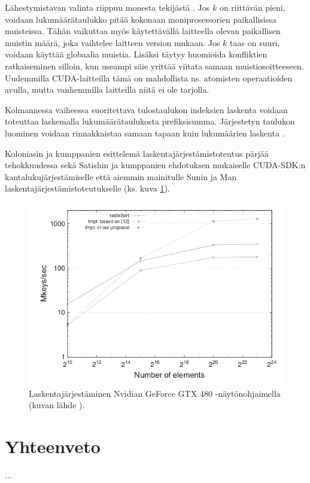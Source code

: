 \documentclass[a4paper,11pt]{article}
\begin{document}
Lähestymistavan valinta riippuu monesta tekijästä \cite{kolonias2011}. Jos $k$ on riittävän pieni, voidaan lukumäärätaulukko pitää kokonaan moniprosessorien paikallisissa muisteissa. Tähän vaikuttaa myös käytettävällä laitteella olevan paikallisen muistin määrä, joka vaihtelee laitteen version mukaan. Jos $k$ taas on suuri, voidaan käyttää globaalia muistia. Lisäksi täytyy huomioida konfliktien ratkaiseminen silloin, kun useampi säie yrittää viitata samaan muistiosoitteeseen. Uudemmilla CUDA-laitteilla tämä on mahdollista ns. atomisten operaatioiden avulla, mutta vanhemmilla laitteilla niitä ei ole tarjolla.

Kolmannessa vaiheessa suoritettava tulostaulukon indeksien laskenta voidaan toteuttaa laskemalla lukumäärätaulukosta prefiksisumma. Järjestetyn taulukon luominen voidaan rinnakkaistaa samaan tapaan kuin lukumäärien laskenta \cite{kolonias2011}. %

Koloniasin ja kumppanien esittelemä laskentajärjestämistoteutus pärjää tehokkuudessa sekä Satishin ja kumppanien ehdotuksen \cite{satish2009} mukaiselle CUDA-SDK:n kantalukujärjestämiselle että aiemmin mainitulle Sunin ja Man \cite{sun2009} laskentajärjestämistoteutukselle (ks. kuva \ref{fig:countsort_comparison}).

\begin{figure}
\centering
\includegraphics[scale = 0.45]{countsort_comparison}
\caption{Laskentajärjestäminen Nvidian GeForce GTX 480 -näytönohjaimella (kuvan lähde \cite{kolonias2011}).}
\label{fig:countsort_comparison}
\end{figure}



\section{Yhteenveto}

...

\printbibliography
\end{document}
